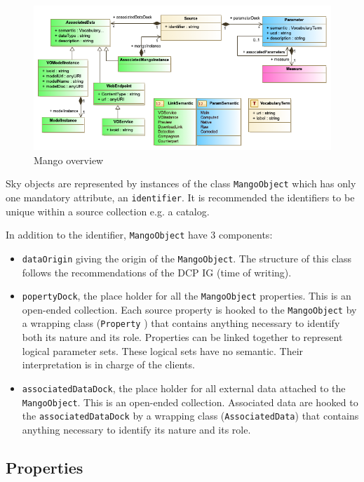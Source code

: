 \documentclass[11pt,a4paper]{ivoa}
\begin{document}
\begin{figure}
    \includegraphics[width=1.0\textwidth]{../model/mangoOverview.png}
    \caption{Mango overview} 
    \label{fig:overview}
\end{figure}


Sky objects are represented by instances of the class \texttt{MangoObject} which has only
one mandatory attribute, an \texttt{identifier}.
It is recommended the identifiers to be unique within a source collection e.g. a catalog.

In addition to the identifier, \texttt{MangoObject}  have 3 components:

\begin{itemize}
  \item \texttt{dataOrigin} giving the origin of the \texttt{MangoObject}. The structure of this class follows
        the recommendations of the DCP IG (time of writing).
  \item \texttt{popertyDock}, the place holder for all the \texttt{MangoObject} properties.
        This is an open-ended collection.
        Each source property is hooked to the \texttt{MangoObject} by a wrapping class (\texttt{Property} )
        that contains anything necessary to identify both its nature and its role.
        Properties can be linked together to represent logical parameter sets. 
        These logical sets have no semantic. Their interpretation is in charge of the clients.
  \item \texttt{associatedDataDock}, the place holder for all external data attached to the \texttt{MangoObject}.
        This is an open-ended collection.
  		Associated data are hooked to the \texttt{associatedDataDock} by a wrapping class (\texttt{AssociatedData})
        that contains anything necessary to identify its nature and its role.
\end{itemize}
\subsection{Properties}
\end{document}
